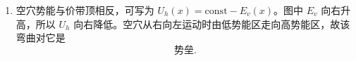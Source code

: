 \begin{question}[12 分]
\begin{solution}
\begin{enumerate}
  在各向同性抛物近似下
  \[
    \frac1{m_h^*}=-\frac1{m_e^*},
  \]
  因价带顶电子 $m_e^*<0$，故 $m_h^*>0$。空穴半经典运动方程为
  \[
    \hbar\dot{\vb k}_h=e(\vb E+\vb v_h\times\vb B).
  \]
  又 $\dot{\vb v}_h=\hbar\dot{\vb k}_h/m_h^*$，因此单个空穴电流变化率
  \[
    \boxed{\frac{\dd\vb j}{\dd t}
    =\frac{e^2}{Vm_h^*}(\vb E+\vb v_h\times\vb B).}
  \]
  若有空穴密度 $p$，则把 $1/V$ 替换为 $p$。

  \item 空穴势能与价带顶相反，可写为
  $U_h(x)=\text{const}-E_v(x)$。图中 $E_v$ 向右升高，所以 $U_h$ 向右降低。空穴从右向左运动时由低势能区走向高势能区，故该弯曲对它是
  \[
    \boxed{\text{势垒}.}
  \]
\end{enumerate}
\end{solution}
\end{question}

